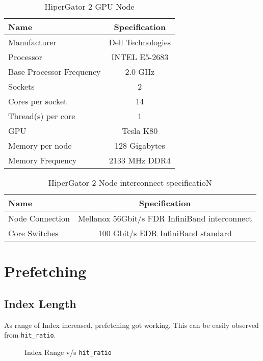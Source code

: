 \begin{table}[h]
  \begin{tabular}{l | c}
    Name                       & Specification     \\ \hline
    Manufacturer               & Dell Technologies \\
    Processor                  & INTEL E5-2683     \\
    Base Processor Frequency   & 2.0 GHz           \\
    Sockets                    & 2                 \\
    Cores per socket           & 14                \\
    Thread(s) per core         & 1                 \\
    GPU                        & Tesla K80         \\
    Memory per node            & 128 Gigabytes     \\
    Memory Frequency           & 2133 MHz DDR4     \\
  \end{tabular}
  \caption{HiperGator 2 GPU Node}
  \label{tab:hpggpuspecs}
\end{table}

\begin{table}[h]
  \begin{tabular}{l | c}
    Name             & Specification   \\ \hline
    Node Connection  & Mellanox 56Gbit/s FDR InfiniBand interconnect \\
    Core Switches    & 100 Gbit/s EDR InfiniBand standard            \\
  \end{tabular}
  \caption{HiperGator 2 Node interconnect specificatioN}
  \label{tab:hpgconnectspecs}
\end{table}

\section{Prefetching}
\subsection{Index Length}
As range of Index increased, prefetching got working. This can be easily observed
from \texttt{hit\_ratio}.
\begin{figure}[h]
  
  \caption{Index Range v/s \texttt{hit\_ratio}}
\end{figure}

